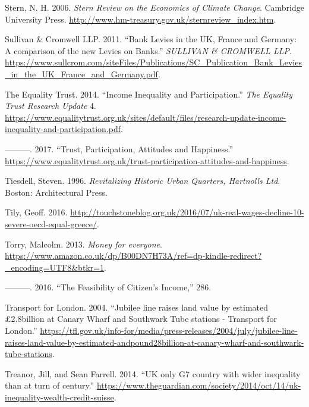 \documentclass[]{tufte-handout}
\begin{document}
\leavevmode\hypertarget{ref-Stern2006a}{}%
Stern, N. H. 2006. \emph{Stern Review on the Economics of Climate
Change}. Cambridge University Press.
\url{http://www.hm-treasury.gov.uk/sternreview_index.htm}.

\leavevmode\hypertarget{ref-SullivanCromwellLLP2011}{}%
Sullivan \& Cromwell LLP. 2011. ``Bank Levies in the UK, France and
Germany: A comparison of the new Levies on Banks.'' \emph{SULLIVAN \&
CROMWELL LLP}.
\url{https://www.sullcrom.com/siteFiles/Publications/SC_Publication_Bank_Levies_in_the_UK_France_and_Germany.pdf}.

\leavevmode\hypertarget{ref-EqualityTrust2014}{}%
The Equality Trust. 2014. ``Income Inequality and Participation.''
\emph{The Equality Trust Research Update} 4.
\url{https://www.equalitytrust.org.uk/sites/default/files/research-update-income-inequality-and-participation.pdf}.

\leavevmode\hypertarget{ref-EqualityTrust2017}{}%
---------. 2017. ``Trust, Participation, Attitudes and Happiness.''
\url{https://www.equalitytrust.org.uk/trust-participation-attitudes-and-happiness}.

\leavevmode\hypertarget{ref-tiesdell1996}{}%
Tiesdell, Steven. 1996. \emph{Revitalizing Historic Urban Quarters,
Hartnolls Ltd}. Boston: Architectural Press.

\leavevmode\hypertarget{ref-Tily2016}{}%
Tily, Geoff. 2016.
\url{http://touchstoneblog.org.uk/2016/07/uk-real-wages-decline-10-severe-oecd-equal-greece/}.

\leavevmode\hypertarget{ref-Torry2013}{}%
Torry, Malcolm. 2013. \emph{Money for everyone}.
\url{https://www.amazon.co.uk/dp/B00DN7H73A/ref=dp-kindle-redirect?_encoding=UTF8\&btkr=1}.

\leavevmode\hypertarget{ref-Torry2016}{}%
---------. 2016. ``The Feasibility of Citizen's Income,'' 286.

\leavevmode\hypertarget{ref-TransportforLondon2004}{}%
Transport for London. 2004. ``Jubilee line raises land value by
estimated £2.8billion at Canary Wharf and Southwark Tube stations -
Transport for London.''
\url{https://tfl.gov.uk/info-for/media/press-releases/2004/july/jubilee-line-raises-land-value-by-estimated-andpound28billion-at-canary-wharf-and-southwark-tube-stations}.

\leavevmode\hypertarget{ref-TreanorFarrell2014}{}%
Treanor, Jill, and Sean Farrell. 2014. ``UK only G7 country with wider
inequality than at turn of century.''
\url{https://www.theguardian.com/society/2014/oct/14/uk-inequality-wealth-credit-suisse}.
\end{document}
